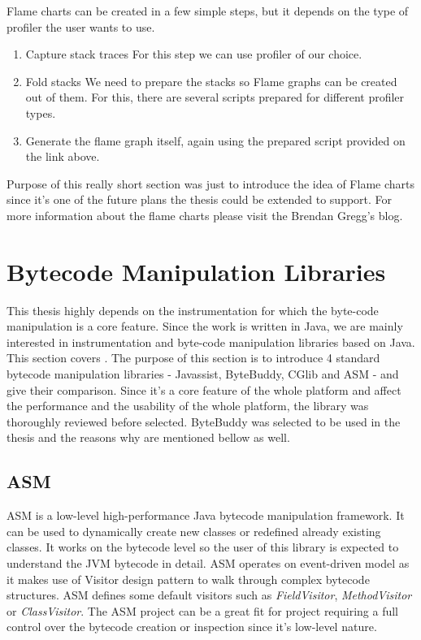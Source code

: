 Flame charts can be created in a few simple steps, but it depends on the type of profiler the user wants to use. 
\begin{enumerate}
	\item Capture stack traces
	For this step we can use profiler of our choice.
	\item Fold stacks
	We need to prepare the stacks so Flame graphs can be created out of them. For this, there are several scripts prepared for different profiler types.
	\item Generate the flame graph itself, again using the prepared script provided on the link above.
\end{enumerate}

Purpose of this really short section was just to introduce the idea of Flame charts since it's one of the future plans the thesis could be extended to support. For more information about the flame charts please visit the Brendan Gregg's blog.
\section{Bytecode Manipulation Libraries}
This thesis highly depends on the instrumentation for which the byte-code manipulation is a core feature. Since the work is written in Java, we are mainly interested in instrumentation and byte-code manipulation libraries based on Java. This section covers . The purpose of this section is to introduce 4 standard bytecode manipulation libraries - Javassist, ByteBuddy, CGlib and ASM - and give their comparison. Since it's a core feature of the whole platform and affect the performance and the usability of the whole platform, the library was thoroughly reviewed before selected. ByteBuddy was selected to be used in the thesis and the reasons why are mentioned bellow as well.

\subsection{ASM}
ASM is a low-level high-performance Java bytecode manipulation framework. It can be used to dynamically create new classes or redefined already existing classes. It works on the bytecode level so the user of this library is expected to understand the JVM bytecode in detail. ASM operates on event-driven model as it makes use of Visitor design pattern to walk through complex bytecode structures. ASM defines some default visitors such as \textit{FieldVisitor}, \textit{MethodVisitor} or \textit{ClassVisitor}. The ASM project can be a great fit for project requiring a full control over the bytecode creation or inspection since it's low-level nature.
